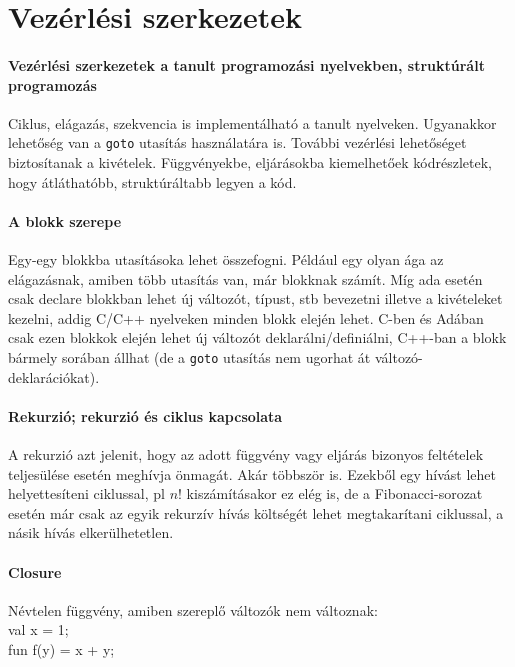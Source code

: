 \documentclass[fleqn,10pt,a4paper]{article}
\newcommand{\ut}[1]{\texttt{#1}}
\theoremstyle{magyar}
\begin{document}
  
  \newpage
  \section{Vezérlési szerkezetek}
  \paragraph[Vezérlési szerkezetek, struktúrált programozás]{Vezérlési
    szerkezetek a tanult programozási nyelvekben, struktúrált
    programozás}
  Ciklus, elágazás, szekvencia is implementálható a tanult
  nyelveken. Ugyanakkor lehetőség van a \ut{goto} utasítás
  használatára is. További vezérlési lehetőséget biztosítanak a
  kivételek. Függvényekbe, eljárásokba kiemelhetőek kódrészletek, hogy
  átláthatóbb, struktúráltabb legyen a kód.
  
  \paragraph{A blokk szerepe}
  Egy-egy blokkba utasításoka lehet összefogni. Például egy olyan ága
  az elágazásnak, amiben több utasítás van, már blokknak számít. Míg
  ada esetén csak declare blokkban lehet új változót, típust, stb
  bevezetni illetve a kivételeket kezelni, addig C/C++ nyelveken
  minden blokk elején lehet. C-ben és Adában csak ezen blokkok elején
  lehet új változót deklarálni/definiálni, C++-ban a blokk bármely
  sorában állhat (de a \ut{goto} utasítás nem ugorhat át
  változó-deklarációkat).

  \paragraph{Rekurzió; rekurzió és ciklus kapcsolata}
  A rekurzió azt jelenit, hogy az adott függvény vagy eljárás bizonyos
  feltételek teljesülése esetén meghívja önmagát. Akár többször
  is. Ezekből egy hívást lehet helyettesíteni ciklussal, pl $n!$
  kiszámításakor ez elég is, de a Fibonacci-sorozat esetén már
  csak az egyik rekurzív hívás költségét lehet megtakarítani
  ciklussal, a násik hívás elkerülhetetlen.
  \paragraph{Closure}
  Névtelen függvény, amiben szereplő változók nem változnak:\\
  val x = 1;\\
  fun f(y) = x + y;\\
\end{document}
